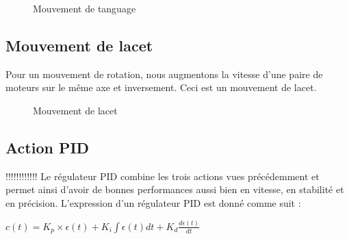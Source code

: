 	
	\begin{figure}[h] 
	\begin{center}
		\centering
	\end{center}
	\caption{Mouvement de tanguage}
	\end{figure}
	
	\subsection{Mouvement de lacet}
	Pour un mouvement de rotation, nous augmentons la vitesse d’une paire de moteurs sur le même axe et inversement. Ceci est un mouvement de lacet.
	\begin{figure} [h]
	\begin{center}
	\end{center}
	\caption{Mouvement de lacet}	
\end{figure}
\newpage
\subsection {Action PID} !!!!!!!!!!!!
Le régulateur PID combine les trois actions vues précédemment et permet ainsi d’avoir de
bonnes performances aussi bien en vitesse, en stabilité et en précision. L’expression d’un régulateur PID est donné comme suit :

$ c(t)=K_p\times \epsilon(t) + K_i\int\epsilon(t)dt+K_d\frac{d\epsilon(t)}{dt}$



